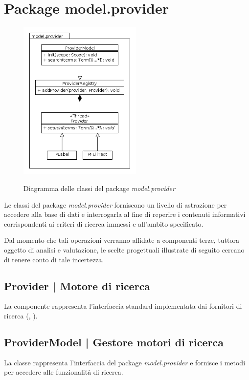\documentclass[10pt,a4paper,headinclude,footinclude,hidelinks]{scrreprt} %
\begin{document}
	\section{Package model.provider}
	\label{sec:stage:design:model.provider}

	\begin{figure}[ht]
		\begin{center}
	    	\includegraphics[height=8cm]{class/model_provider.png}
			\label{gfx:package:model:provider}
			\caption{Diagramma delle classi del package \textit{model.provider}}
		\end{center}
	\end{figure}

	Le classi del package \textit{model.provider} forniscono un livello di astrazione per accedere alla base di dati e interrogarla al fine di reperire i contenuti informativi corrispondenti ai criteri di ricerca immessi e all'ambito specificato.

	Dal momento che tali operazioni verranno affidate a componenti terze, tuttora oggetto di analisi e valutazione, le scelte progettuali illustrate di seguito cercano di tenere conto di tale incertezza.

	\subsection[Provider]{Provider | Motore di ricerca}
	\label{sec:stage:design:model.search:search-provider}
	La componente rappresenta l'interfaccia standard implementata dai fornitori di ricerca (\textit{}, \textit{}).

	\subsection[ProviderModel]{ProviderModel | Gestore motori di ricerca}
	\label{sec:stage:design:model.search:provider-model}
	La classe \textit{} rappresenta l'interfaccia del package \textit{model.provider} e fornisce i metodi per accedere alle funzionalità di ricerca.
\end{document}
